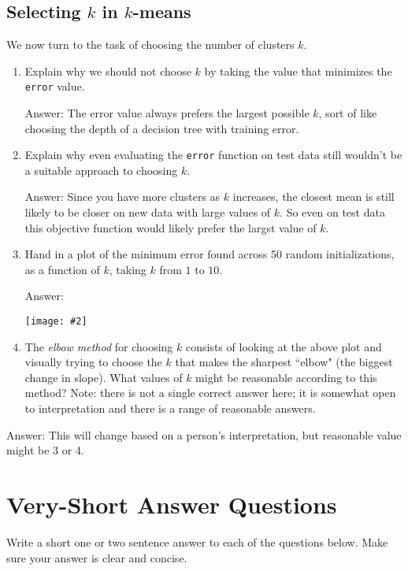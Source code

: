 \documentclass{article}
\def\ans#1{\par\gre{Answer: #1}}
\def\blu#1{{\color{blu}#1}}
\def\gre#1{{\color{gre}#1}}
\newcommand{\centerfig}[2]{\begin{center}\texttt{[image: \#2]}\end{center}}
\def\enum#1{\begin{enumerate}#1\end{enumerate}}
\begin{document}
	
	\subsection{Selecting $k$ in $k$-means}
	
	We now turn to the task of choosing the number of clusters $k$.
	
	\blu{\enum{
			\item Explain why we should not choose $k$ by taking the value that minimizes the \texttt{error} value.
			\ans{The error value always prefers the largest possible $k$, sort of like choosing the depth of a decision tree with training error.}
			\item Explain why even evaluating the \texttt{error} function on test data still wouldn't be a suitable approach to choosing $k$.
			\ans{Since you have more clusters as $k$ increases, the closest mean is still likely to be closer on new data with large values of $k$. So even on test data this objective function would likely prefer the largst value of $k$.}
			\item Hand in a plot of the minimum error found across 50 random initializations, as a function of $k$, taking $k$ from $1$ to $10$.
			\ans{\centerfig{0.5}{../figs/kmeans_err_k.png}}
			\item The \emph{elbow method} for choosing $k$ consists of looking at the above plot and visually trying to choose the $k$ that makes the sharpest ``elbow" (the biggest change in slope). What values of $k$ might be reasonable according to this method? Note: there is not a single correct answer here; it is somewhat open to interpretation and there is a range of reasonable answers.
	}}
	\ans{This will change based on a person's interpretation, but reasonable value might be 3 or 4.}
	
	\section{Very-Short Answer Questions}
	
	\blu{Write a short one or two sentence answer to each of the questions below}. Make sure your answer is clear and concise.
	
\end{document}
